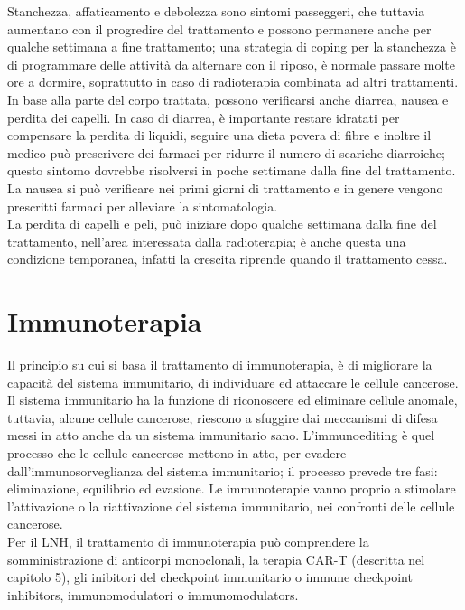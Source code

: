 Stanchezza, affaticamento e debolezza sono sintomi passeggeri, che tuttavia aumentano con il progredire del 
trattamento e possono permanere anche per qualche settimana a fine trattamento; 
una strategia di coping per la stanchezza è di programmare delle attività da alternare con il riposo, 
è normale passare molte ore a dormire, soprattutto in caso di radioterapia combinata 
ad altri trattamenti\cite{UKRADIOTP}.\\ 
In base alla parte del corpo trattata, possono verificarsi anche diarrea, nausea e perdita dei capelli. In caso di 
diarrea, è importante restare idratati per compensare la perdita di liquidi, seguire una dieta povera di fibre e 
inoltre il medico può prescrivere dei farmaci per ridurre il numero di scariche diarroiche; questo sintomo dovrebbe 
risolversi in poche settimane dalla fine del trattamento\cite{UKRADIOTP}. La nausea si può 
verificare nei primi giorni di trattamento e in genere vengono prescritti farmaci per alleviare 
la sintomatologia.\\ 
La perdita di capelli e peli, può iniziare dopo qualche settimana dalla fine del trattamento, nell’area 
interessata dalla radioterapia; è anche questa una condizione temporanea, infatti la crescita riprende quando il 
trattamento cessa\cite{UKRADIOTP}.

\section{Immunoterapia}
Il principio su cui si basa il trattamento di immunoterapia, è di migliorare la capacità 
del sistema immunitario, di individuare ed attaccare le cellule cancerose.\\ 
Il sistema immunitario ha la funzione di riconoscere ed eliminare cellule anomale, tuttavia, alcune cellule cancerose, 
riescono a sfuggire dai meccanismi di difesa messi in atto anche da un sistema immunitario sano. 
L’immunoediting è quel processo che le cellule cancerose mettono in atto, per evadere dall’immunosorveglianza del 
sistema immunitario; il processo prevede tre fasi: eliminazione, equilibrio ed evasione. Le immunoterapie vanno 
proprio a stimolare l’attivazione o la riattivazione del sistema immunitario, nei confronti delle cellule 
cancerose\cite{IMMUNOTP}.\\
Per il LNH, il trattamento di immunoterapia può comprendere la somministrazione di anticorpi monoclonali, 
la terapia CAR-T (descritta nel capitolo 5), 
gli inibitori del checkpoint immunitario o immune checkpoint inhibitors, 
immunomodulatori o immunomodulators.

